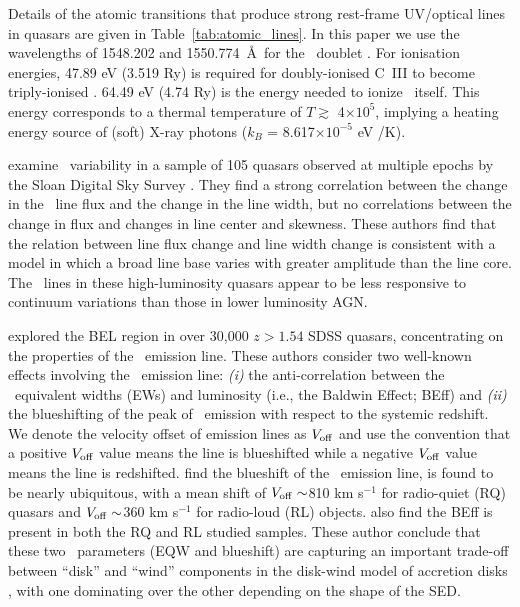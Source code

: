 \documentclass[a4paper,fleqn,usenatbib]{mnras}
\begin{document}
Details of the atomic transitions that produce strong rest-frame
UV/optical lines in quasars are given in
Table~\ref{tab:atomic_lines}. In this paper we use the wavelengths of
1548.202 and 1550.774~\AA\ for the \civ\ doublet
\citep{Kramida2018}. For ionisation energies, 47.89 eV (3.519 Ry) is
required for doubly-ionised C~III to become triply-ionised \civ.
64.49 eV (4.74 Ry) is the energy needed to ionize \civ\ itself. This
energy corresponds to a thermal temperature of $T \gtrsim$
4$\times10^{5}$, implying a heating energy source of (soft) X-ray
photons ($k_{B}$ = 8.617$\times 10^{-5}$ eV /K).

\citet{Wilhite2006} examine \civ\ variability in a sample
of 105 quasars observed at multiple epochs by the Sloan Digital Sky
Survey \citep[SDSS;][]{York2000, Stoughton2002, Abazajian2009}.  They
find a strong correlation between the change in the \civ\ line
flux and the change in the line width, but no correlations between the
change in flux and changes in line center and skewness.  These authors
find that the relation between line flux change and line width change
is consistent with a model in which a broad line base varies with
greater amplitude than the line core. The \civ\ lines in these
high-luminosity quasars appear to be less responsive to continuum
variations than those in lower luminosity AGN.

\citet{Richards2011} explored the BEL region in over 30,000 $z > 1.54$
SDSS quasars, concentrating on the properties of the \civ\ emission
line. These authors consider two well-known effects involving the
\civ\ emission line: {\it (i)} the anti-correlation between the \civ\
equivalent widths (EWs) and luminosity (i.e., the Baldwin Effect;
BEff) and {\it (ii)} the blueshifting of the peak of \civ\ emission
with respect to the systemic redshift.  We denote the velocity offset
of emission lines as $V_{\rm off}$ and use the convention that a
positive $V_{\rm off}$ value means the line is blueshifted while a
negative $V_{\rm off}$ value means the line is redshifted.
\citet{Richards2011} find the blueshift of the \civ\ emission line, is
found to be nearly ubiquitous, with a mean shift of $V_{\rm off}
\sim$810 km s$^{-1}$ for radio-quiet (RQ) quasars and $V_{\rm off}
\sim$360 km s$^{-1}$ for radio-loud (RL) objects. \citet{Richards2011}
also find the BEff is present in both the RQ and RL studied samples.
These author conclude
that these two \civ\ parameters (EQW and blueshift) are capturing an
important trade-off between ``disk'' and ``wind'' components in the
disk-wind model of accretion disks \citep[e.g.,][]{Murray1995,
Elvis2000, Proga2000, Leighly2004b}, with one dominating over the other depending on
the shape of the SED.
\end{document}
